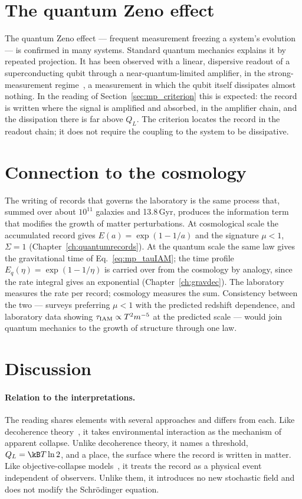 \section{The quantum Zeno effect}\label{sec:mp_zeno}
The quantum Zeno effect --- frequent measurement freezing a system's evolution~\cite{Itano1990} --- is confirmed in many systems. Standard quantum
mechanics explains it by repeated projection. It has been observed with a linear, dispersive readout of a superconducting qubit through a
near-quantum-limited amplifier, in the strong-measurement regime~\cite{Slichter2016}, a measurement in which the qubit itself dissipates almost nothing. \observed{} In the reading of
Section~\ref{sec:mp_criterion} this is expected: the record is written where the signal is amplified and absorbed, in the amplifier chain, and the
dissipation there is far above $Q_L$. The criterion locates the record in the readout chain; it does not require the coupling to the system to be
dissipative. \interp

\section{Connection to the cosmology}\label{sec:mp_cosmo}
The writing of records that governs the laboratory is the same process that, summed over about $10^{11}$ galaxies and 13.8\,Gyr, produces the
information term that modifies the growth of matter perturbations. At cosmological scale the accumulated record gives $E(a)=\exp(1-1/a)$ and the
signature $\mu<1$, $\Sigma=1$ (Chapter~\ref{ch:quantumrecords}). \interp{} At the quantum scale the same law gives the gravitational time of
Eq.~\eqref{eq:mp_tauIAM}; the time profile $E_q(\eta)=\exp(1-1/\eta)$ is carried over from the cosmology by analogy, since the rate integral gives an
exponential (Chapter~\ref{ch:gravdec}). \conjecture{} The laboratory measures the rate per record; cosmology measures the sum. Consistency between the
two --- surveys preferring $\mu<1$ with the predicted redshift dependence, and laboratory data showing $\tau_{\rm IAM}\propto T^2m^{-5}$ at the predicted
scale --- would join quantum mechanics to the growth of structure through one law. \prediction

\section{Discussion}\label{sec:mp_discussion}
\paragraph{Relation to the interpretations.} The reading shares elements with several approaches and differs from each. Like decoherence
theory~\cite{Zurek2003}, it takes environmental interaction as the mechanism of apparent collapse. Unlike decoherence theory, it names a threshold,
$Q_L=\kB T\ln2$, and a place, the surface where the record is written in matter. Like objective-collapse models~\cite{Penrose1996,Diosi1987}, it treats
the record as a physical event independent of observers. Unlike them, it introduces no new stochastic field and does not modify the Schr\"odinger
equation. \interp

